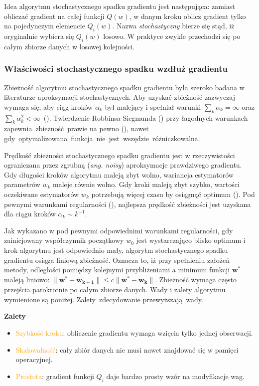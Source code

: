 Idea algorytmu stochastycznego spadku gradientu jest następująca: zamiast obliczać gradient na całej funkcji $Q(w)$, w danym kroku oblicz
gradient tylko na pojedynczym elemencie $Q_{i}(w)$. Nazwa \textit{stochastyczny} bierze się stąd, iż oryginalnie wybiera
się $Q_{i}(w)$ losowo. W praktyce zwykle przechodzi się po całym zbiorze danych w losowej kolejności.
\subsubsection{Właściwości stochastycznego spadku wzdłuż gradientu}
Zbieżność algorytmu stochastycznego spadku gradientu była szeroko badana w literaturze aproksymacji stochastycznych. Aby uzyskać zbieżność zazwyczaj wymaga się, aby ciąg kroków $\alpha_k$ był malejący i spełniał warunki $\sum\nolimits_k \alpha_k = \infty$ oraz $\sum\nolimits_k \alpha_k^2 < \infty$~(\cite{bott1}).
Twierdzenie Robbinsa-Siegmunda (\cite{robbins}) przy łagodnych warunkach zapewnia~zbieżność~prawie na pewno (\cite{bottDOD}), nawet  gdy~optymalizowana~funkcja~nie~jest~wszędzie~różniczkowalna.

Prędkość zbieżności stochastycznego spadku gradientu jest w rzeczywistości ograniczana przez zgrubną (\textit{ang. noisy}) aproksymacje prawdziwego gradientu. Gdy długości kroków algorytmu
maleją zbyt wolno, wariancja estymatorów parametrów $w_k$ maleje równie wolno. Gdy kroki maleją
zbyt szybko, wartości oczekiwane estymatorów $w_k$ potrzebują więcej czasu by osiągnąć optimum (\cite{bott1}). Pod pewnymi warunkami regularności (\cite{murata}), najlepsza prędkość zbieżności jest uzyskana dla ciągu kroków $\alpha_k\sim k^{-1}$.

Jak wykazano w \cite{dennis} pod pewnymi odpowiednimi warunkami regularności, gdy zainicjowany współczynnik początkowy $w_0$ jest wystarczająco blisko optimum i krok algorytmu jest odpowiednio mały, algorytm stochastycznego spadku gradientu osiąga liniową zbieżność. Oznacza to, iż przy spełnieniu założeń metody, odległości pomiędzy kolejnymi przybliżeniami a minimum funkcji $\mathbf{w^{\ast}}$ maleją liniowo: $\parallel \mathbf{w^{\ast}} - \mathbf{w_{k+1}} \parallel \leqslant c \parallel \mathbf{w^{\ast}} - \mathbf{w_k} \parallel$. Zbieżność wymaga często przejścia parokrotnie po całym
zbiorze danych. Wady i zalety algorytmu wymienione są poniżej. Zalety~zdecydowanie przewyższają~wady.

\textbf{Zalety} \vspace{-5pt}
\begin{itemize}
\item \textcolor{orange}{Szybkość kroku}: obliczenie gradientu wymaga wzięcia tylko jednej
obserwacji.
\item \textcolor{orange}{Skalowalność}: cały zbiór danych nie musi nawet znajdować się
w pamięci operacyjnej.
\item \textcolor{orange}{Prostota}: gradient funkcji  $Q_{i}$ daje bardzo prosty wzór na
modyfikacje wag.
\end{itemize}

